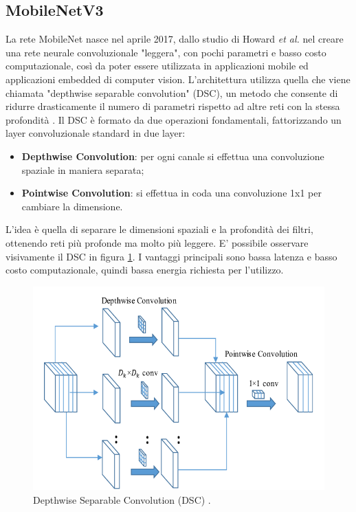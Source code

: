 \documentclass[11pt]{report}
\begin{document}
\subsection{MobileNetV3}

La rete MobileNet nasce nel aprile 2017, dallo studio di Howard \textit{et al.} \cite{mobilenet2017} nel creare una rete neurale convoluzionale "leggera", con pochi parametri e basso costo computazionale, così da poter essere utilizzata in applicazioni mobile ed applicazioni embedded di computer vision.  L'architettura utilizza quella che viene chiamata "depthwise separable convolution" (DSC), un metodo che consente di ridurre drasticamente il numero di parametri rispetto ad altre reti con la stessa profondità  \cite{pujara_2020}. Il DSC è formato da due operazioni fondamentali, fattorizzando un layer convoluzionale standard in due layer:
\begin{itemize}
    \item \textbf{Depthwise Convolution}: per ogni canale si effettua una convoluzione spaziale in maniera separata;
    \item \textbf{Pointwise Convolution}: si effettua in coda una convoluzione 1x1 per cambiare la dimensione.
\end{itemize}

L'idea è quella di separare le dimensioni spaziali e la profondità dei filtri, ottenendo reti più profonde ma molto più leggere. E' possibile osservare visivamente il DSC in figura \ref{fig:DSC}. I vantaggi principali sono bassa latenza e basso costo computazionale, quindi bassa energia richiesta per l'utilizzo.


\begin{figure}
    \centering
    \includegraphics[scale=0.45]{img/Depthwise-separable-convolution-block.png}
    \caption{Depthwise Separable Convolution (DSC) \cite{dsc}.}
    \label{fig:DSC}
\end{figure}
\end{document}
